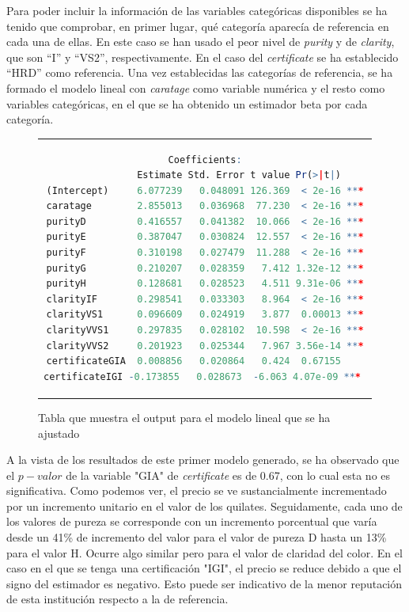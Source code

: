 \documentclass[a4paper, 9pt]{article}
\begin{document}
Para poder incluir la información de las variables categóricas disponibles se ha tenido que comprobar, en primer lugar, qué categoría aparecía de referencia en cada una de ellas. En este caso se han usado el peor nivel de \textit{purity} y de \textit{clarity}, que son “I” y “VS2”, respectivamente. En el caso del \textit{certificate} se ha establecido “HRD” como referencia.
Una vez establecidas las categorías de referencia, se ha formado el modelo lineal con \textit{caratage} como variable numérica y el resto como variables categóricas, en el que se ha obtenido un estimador beta por cada categoría.

\begin{figure}[h!]
    \centering
    \begin{tabular}{c}
        \begin{lstlisting}[language=r]
               Coefficients:
                Estimate Std. Error t value Pr(>|t|)    
(Intercept)     6.077239   0.048091 126.369  < 2e-16 ***
caratage        2.855013   0.036968  77.230  < 2e-16 ***
purityD         0.416557   0.041382  10.066  < 2e-16 ***
purityE         0.387047   0.030824  12.557  < 2e-16 ***
purityF         0.310198   0.027479  11.288  < 2e-16 ***
purityG         0.210207   0.028359   7.412 1.32e-12 ***
purityH         0.128681   0.028523   4.511 9.31e-06 ***
clarityIF       0.298541   0.033303   8.964  < 2e-16 ***
clarityVS1      0.096609   0.024919   3.877  0.00013 ***
clarityVVS1     0.297835   0.028102  10.598  < 2e-16 ***
clarityVVS2     0.201923   0.025344   7.967 3.56e-14 ***
certificateGIA  0.008856   0.020864   0.424  0.67155    
certificateIGI -0.173855   0.028673  -6.063 4.07e-09 *** 
        \end{lstlisting}
    \end{tabular}
    \caption{Tabla que muestra el output para el modelo lineal que se ha ajustado}
    \label{fig:summary_model}
\end{figure}

A la vista de los resultados de este primer modelo generado, se ha observado que el $p-valor$ de la variable "GIA" de  \textit{certificate} es de 0.67, con lo cual esta no es significativa. Como podemos ver, el precio se ve sustancialmente incrementado por un incremento unitario en el valor de los quilates. Seguidamente, cada uno de los valores de pureza se corresponde con un incremento porcentual que varía desde un 41\% de incremento del valor para el valor de pureza D hasta un 13\% para el valor H. Ocurre algo similar pero para el valor de claridad del color. En el caso en el que se tenga una certificación "IGI", el precio se reduce debido a que el signo del estimador es negativo. Esto puede ser indicativo de la menor reputación de esta institución respecto a la de referencia. \\
\end{document}
